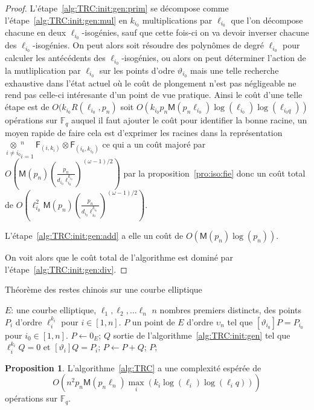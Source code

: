 \documentclass[10pt,a4paper]{book}
\theoremstyle{plain}
\theoremstyle{definition}
\theoremstyle{definition}
\theoremstyle{definition}
\newtheorem{prop}[thm]{Proposition}
\theoremstyle{definition}
\theoremstyle{remark}
\theoremstyle{remark}
\theoremstyle{definition}
\begin{document}
\begin{proof}
L'étape~\ref{alg:TRC:init:gen:prim} se décompose comme 
l'étape~\ref{alg:TRC:init:gen:mul} en $k_{i_0}$ multiplications par 
$\ell_{i_0}$ que l'on décompose chacune en deux $\ell_{i_0}$-isogénies, sauf 
que cette fois-ci on va devoir inverser chacune des $\ell_{i_0}$-isogénies. On 
peut alors soit résoudre des polynômes de degré $\ell_{i_0}$ pour calculer les 
antécédents des $\ell_{i_0}$-isogénies, ou alors on peut déterminer l'action de
la mutliplication par $\ell_{i_0}$ sur les points d'odre $\vartheta_{i_0}$ mais
une telle recherche exhaustive dans l'état actuel où le coût de plongement 
n'est pas négligeable ne rend pas celle-ci intéresante d'un point de vue 
pratique. Ainsi le coût d'une telle étape est de $O(k_{i_0}R(\ell_{i_0},p_n)$ 
soit $O(k_{i_0}p_n\mathsf{M}(p_n\ell_{i_0})\log(\ell_{i_0})\log(\ell_{i_0q}))$ 
opérations sur $\mathbb{F}_q$ auquel il faut ajouter le coût pour identifier la
bonne racine, un moyen rapide de faire cela est d'exprimer les racines dans la 
représentation $\underset{i\neq i_0}\otimes_{i=1}^n \mathsf{F}_{(i,k_i)} \otimes \mathsf{F}_{(i_0,k_{i_0})}$
ce qui a un coût majoré par $O(\mathsf{M}(p_n)(\frac{p_n}{d_{i_0}\ell_{i_0}^{k_{i_0}}})^{(\omega-1)/2})$ par la proposition~\ref{pro:iso:fie} donc un coût total de $O(\ell_{i_0}^2\mathsf{M}(p_n)(\frac{p_n}{d_{i_0}\ell_{i_0}^{k_{i_0}}})^{(\omega-1)/2})$.

L'étape~\ref{alg:TRC:init:gen:add} a elle un coût de $O(\mathsf{M}(p_n)\log(p_n))$.

On voit alors que le coût total de l'algorithme est dominé par 
l'étape~\ref{alg:TRC:init:gen:div}.
\end{proof}

\begin{algorithm}
\caption{\label{alg:TRC} Théorème des restes chinois sur une courbe elliptique}
\begin{algorithmic}[1]
\REQUIRE $E$: une courbe elliptique, $\ell_1,\ell_2, \dots \ell_n$ $n$ nombres premiers distincts, des points $P_i$ d'ordre $\ell_i^{k_i}$ pour $i \in [1,n]$.
\ENSURE $P$ un point de $E$ d'ordre $\upsilon_n$  tel que $[\vartheta_{i_0} ] P=P_{i_0}$ pour $i_0 \in [1,n]$.
\STATE $P \leftarrow 0_E$;
\STATE $Q$ sortie de l'algorithme~\ref{alg:TRC:init:gen} tel que $\ell_i^{k_i}Q=0$ et $[\vartheta_i]Q=P_i$;
\STATE $P \leftarrow P+Q$; 
\ENDFOR
\RETURN $P$;
\end{algorithmic}
\end{algorithm}

\begin{prop}
L'algorithme~\ref{alg:TRC} a une complexité espérée de 
\[
O(n^2 p_{n}\mathsf{M}(p_{n}\ell_{n})\max_i(k_i\log(\ell_{i})\log(\ell_{i}q))) 
\]
opérations sur $\mathbb{F}_q$.
\end{prop}
\end{document}
